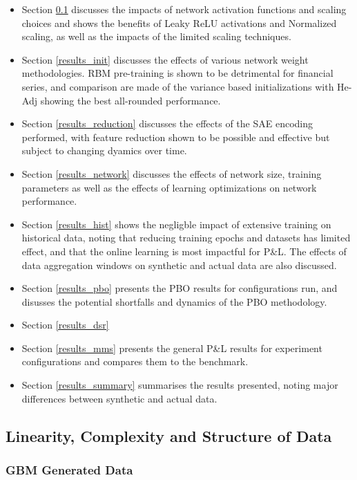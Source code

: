 \documentclass[a4paper,11pt,oneside]{article}
\theoremstyle{plain}
\theoremstyle{definition}
\begin{document}
	\begin{itemize}
		\item[1] Section \ref{results_linearity} discusses the impacts of network activation functions and scaling choices and shows the benefits of Leaky ReLU activations and Normalized scaling, as well as the impacts of the limited scaling techniques.
		\item[2] Section \ref{results_init} discusses the effects of various network weight methodologies. RBM pre-training is shown to be detrimental for financial series, and comparison are made of the variance based initializations with He-Adj showing the best all-rounded performance.
		\item[3] Section \ref{results_reduction} discusses the effects of the SAE encoding performed, with feature reduction shown to be possible and effective but subject to changing dyamics over time.
		\item[4] Section \ref{results_network} discusses the effects of network size, training parameters as well as the effects of learning optimizations on network performance.
		\item[5] Section \ref{results_hist} shows the negligble impact of extensive training on historical data, noting that reducing training epochs and datasets has limited effect, and that the online learning is most impactful for P\&L. The effects of data aggregation windows on synthetic and actual data are also discussed.
		\item[6] Section \ref{results_pbo} presents the PBO results for configurations run, and disusses the potential shortfalls and dynamics of the PBO methodology.
		\item[7] Section \ref{results_dsr} 
		\item[8] Section \ref{results_mms} presents the general P\&L results for experiment configurations and compares them to the benchmark.
		\item[9] Section \ref{results_summary} summarises the results presented, noting major differences between synthetic and actual data.
	\end{itemize}
	
	\newpage
	\subsection{Linearity, Complexity and Structure of Data}\label{results_linearity}
	
	\subsubsection{GBM Generated Data}\label{results_gbm_data}
	
\end{document}
